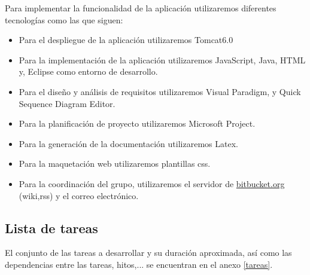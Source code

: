 Para implementar la funcionalidad de la aplicación utilizaremos diferentes tecnologías como las que siguen:
\begin{itemize}
\item Para el despliegue de la aplicación utilizaremos Tomcat6.0
\item Para la implementación de la aplicación utilizaremos JavaScript, Java, HTML y, Eclipse como entorno de desarrollo.
\item Para el diseño y análisis de requisitos utilizaremos Visual Paradigm, y Quick Sequence Diagram Editor.
\item Para la planificación de proyecto utilizaremos  Microsoft Project.
\item Para la generación de la documentación utilizaremos Latex.
\item Para la maquetación web utilizaremos plantillas css.
\item Para la coordinación del grupo, utilizaremos el servidor de \url{bitbucket.org} (wiki,rss) y el correo electrónico.
\end{itemize}


\subsection{Lista de tareas}

El conjunto de las tareas a desarrollar y su duración aproximada, así como las dependencias entre las tareas, hitos,... se encuentran en el anexo \ref{tareas}.

